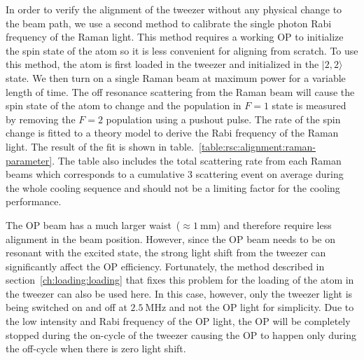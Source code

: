 In order to verify the alignment of the tweezer without any physical change to the beam path,
we use a second method to calibrate the single photon Rabi frequency of the Raman light.
This method requires a working OP to initialize the spin state of the atom
so it is less convenient for aligning from scratch.
To use this method, the atom is first loaded in the tweezer and initialized
in the $|2,2\rangle$ state. We then turn on a single Raman beam at maximum power for a
variable length of time. The off resonance scattering from the Raman beam will cause
the spin state of the atom to change and the population in $F=1$ state is measured
by removing the $F=2$ population using a pushout pulse.
The rate of the spin change is fitted to a theory model to derive the Rabi frequency of
the Raman light.
The result of the fit is shown in table.~\ref{table:rsc:alignment:raman-parameter}.
The table also includes the total scattering rate from each Raman beams
which corresponds to a cumulative $3$ scattering event
on average during the whole cooling sequence and
should not be a limiting factor for the cooling performance.

The OP beam has a much larger waist~($\approx\!1~\mathrm{mm}$)
and therefore require less alignment in the beam position.
However, since the OP beam needs to be on resonant with the excited state,
the strong light shift from the tweezer can significantly affect the OP efficiency.
Fortunately, the method described in section~\ref{ch:loading:loading}
that fixes this problem for the loading of the atom in the tweezer can also be used here.
In this case, however, only the tweezer light is being switched on and off at $2.5~\mathrm{MHz}$
and not the OP light for simplicity.
Due to the low intensity and Rabi frequency of the OP light,
the OP will be completely stopped during the on-cycle of the tweezer
causing the OP to happen only during the off-cycle when there is zero light shift.

